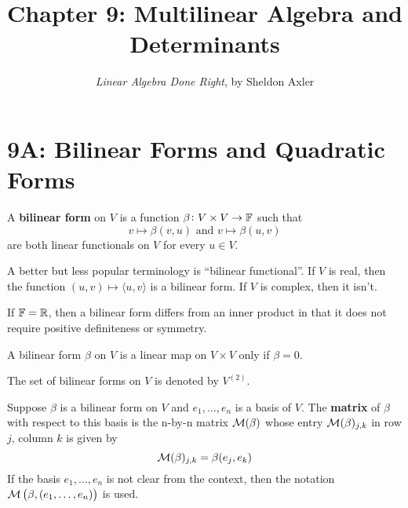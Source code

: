 \documentclass{extarticle}
\title{\vspace{-2em}Chapter 9: Multilinear Algebra and Determinants}
\author{\emph{Linear Algebra Done Right}, by Sheldon Axler}
\date{}
\begin{document}
\maketitle 
\tableofcontents

\newpage 




\newpage 
\section*{9A: Bilinear Forms and Quadratic Forms}


\begin{definition}
    A \textbf{bilinear form} on \(V\) is a function \(\beta \colon V \times V \to \mathbb{F}\) 
    such that 
    \[v \mapsto \beta(v, u) \text{  and  } v \mapsto \beta(u,v)\]
    are both linear functionals on \(V\) for every \(u \in V\).
\end{definition}

\begin{remark}
    A better but less popular terminology is ``bilinear functional''. If \(V\) is real, 
    then the function \((u, v) \mapsto \langle u,v \rangle\) is a bilinear form. If \(V\) is 
    complex, then it isn't.
\end{remark}

\begin{remark}
    If \(\mathbb{F} = \mathbb{R}\), then a bilinear form differs from an inner product in that it does not require 
    positive definiteness or symmetry. 
\end{remark}


\begin{remark}
    A bilinear form \(\beta\) on \(V\) is a linear map on \(V \times V\) only if \(\beta = 0\).
\end{remark}

\begin{definition}[\(V^{(2)}\)]
    The set of bilinear forms on \(V\) is denoted by \(V^{(2)}\).
\end{definition}


\begin{definition}
    Suppose \(\beta\) is a bilinear form on \(V\) and \(e_1, \ldots, e_n\) is a basis of \(V\). The \textbf{matrix}
    of \(\beta\) with respect to this basis is the n-by-n matrix \(\mathcal{M}(\beta)\) whose entry 
    \(\mathcal{M}(\beta)_{j, k}\) in row \(j\), column \(k\) is given by 
    \[\mathcal{M} (\beta)_{j, k} = \beta (e_j, e_k)\]
    If the basis \(e_1, \ldots, e_n\) is not clear from the context, then the notation 
    \(\mathcal{M} \left( \beta, (e_1, \ldots, e_n) \right)\) is used. 
\end{definition}
\end{document}
